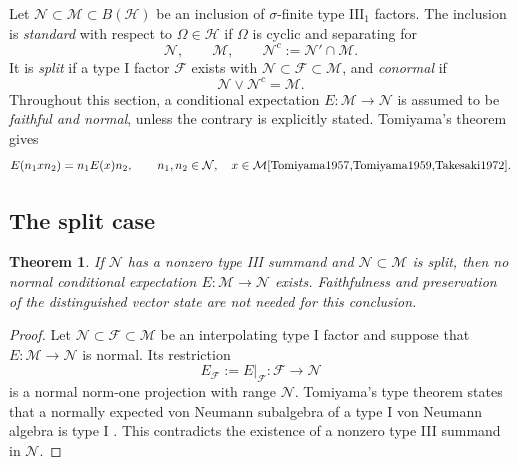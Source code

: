 \documentclass[a4paper,11pt]{article}
\newtheorem{theorem}{Theorem}
\theoremstyle{definition}
\begin{document}
Let $\mathcal N\subset\mathcal M\subset B(\mathcal H)$ be an inclusion of
$\sigma$-finite type $\mathrm{III}_1$ factors.  The inclusion is
\emph{standard} with respect to $\Omega\in\mathcal H$ if $\Omega$ is cyclic
and separating for
\begin{equation}
 \mathcal N,\qquad \mathcal M,\qquad
 \mathcal N^c:=\mathcal N'\cap\mathcal M.
\end{equation}
It is \emph{split} if a type I factor $\mathcal F$ exists with
$\mathcal N\subset\mathcal F\subset\mathcal M$, and \emph{conormal} if
\begin{equation}
 \mathcal N\vee\mathcal N^c=\mathcal M.
\end{equation}
Throughout this section, a conditional expectation
$E:\mathcal M\to\mathcal N$ is assumed to be \emph{faithful and normal},
unless the contrary is explicitly stated.  Tomiyama's theorem gives
\begin{equation}
 E(n_1xn_2)=n_1E(x)n_2,
 \qquad n_1,n_2\in\mathcal N,\quad x\in\mathcal M
 \cite{Tomiyama1957,Tomiyama1959,Takesaki1972}.
\end{equation}

\subsection{The split case}

\begin{theorem}\label{thm:split-no-expectation}
If $\mathcal N$ has a nonzero type III summand and
$\mathcal N\subset\mathcal M$ is split, then no normal conditional expectation
$E:\mathcal M\to\mathcal N$ exists.  Faithfulness and preservation of the
distinguished vector state are not needed for this conclusion.
\end{theorem}

\begin{proof}
Let $\mathcal N\subset\mathcal F\subset\mathcal M$ be an interpolating type I
factor and suppose that $E:\mathcal M\to\mathcal N$ is normal.  Its restriction
\begin{equation}
 E_{\mathcal F}:=E|_{\mathcal F}:\mathcal F\longrightarrow\mathcal N
\end{equation}
is a normal norm-one projection with range $\mathcal N$.  Tomiyama's type
theorem states that a normally expected von Neumann subalgebra of a type I von
Neumann algebra is type I \cite{Tomiyama1959}\cite{Takesaki1972}. This contradicts
the existence of a nonzero type III summand in $\mathcal N$.
\end{proof}
\end{document}
